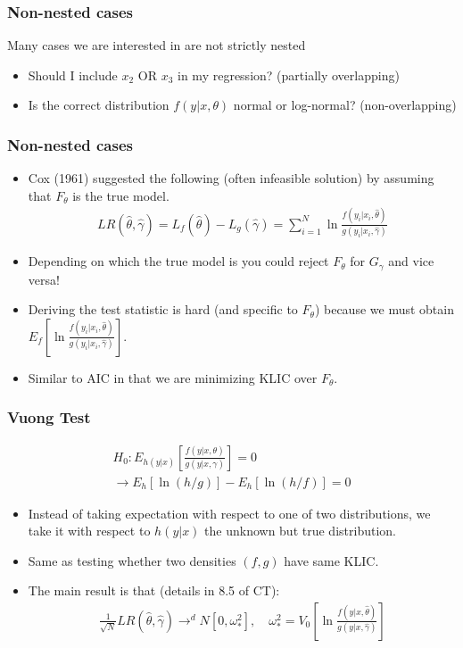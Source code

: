 \documentclass[xcolor=pdftex,dvipsnames,table,mathserif,aspectratio=169]{beamer}
\begin{document}
\begin{frame}
\frametitle{Non-nested cases}
Many cases we are interested in are \alert{not strictly nested}
\begin{itemize}
\item Should I include $x_2$ OR $x_3$ in my regression? (partially overlapping)
\item Is the correct distribution $f(y | x, \theta)$ normal or log-normal? (non-overlapping)
\end{itemize}
\end{frame}

\begin{frame}
\frametitle{Non-nested cases}
\begin{itemize}
\item Cox (1961) suggested the following (often infeasible solution) by assuming that $F_{\theta}$ is the true model.
\begin{eqnarray*}
LR(\hat{\theta},\hat{\gamma}) = L_f(\hat{\theta}) - L_g (\hat{\gamma}) = \sum_{i=1}^N \ln \frac{f(y_i | x_i, \hat{\theta})}{g(y_i | x_i, \hat{\gamma})}
\end{eqnarray*}
\item Depending on which the true model is you could reject $F_{\theta}$ for $G_{\gamma}$ and vice versa!
\item Deriving the test statistic is hard (and specific to $F_{\theta}$) because we must obtain $E_f [\ln \frac{f(y_i | x_i, \hat{\theta})}{g(y_i | x_i, \hat{\gamma})}]$.
\item Similar to AIC in that we are minimizing KLIC over $F_{\theta}$.
\end{itemize}
\end{frame}

\begin{frame}
\frametitle{Vuong Test}
\small
\begin{eqnarray*}
H_0: E_{h(y|x)} \left[ \frac{ f(y | x,\theta) }{g(y | x, \gamma)} \right] = 0  \\
\rightarrow E_h[\ln(h/g)] - E_h[\ln (h/f)] = 0
\end{eqnarray*}
\begin{itemize}
\item Instead of taking expectation with respect to one of two distributions, we take it with respect to $h(y |x)$ the unknown but \alert{true distribution}.
\item Same as testing whether two densities $(f,g)$ have same KLIC.
\item The main result is that (details in 8.5 of CT):
\begin{eqnarray*}
\frac{1}{\sqrt{N}} LR(\hat{\theta},\hat{\gamma}) \rightarrow^d N [0,\omega_{*}^2],\quad \omega_{*}^2 =  V_0 \left[ \ln \frac{f(y| x, \hat{\theta})}{g(y| x, \hat{\gamma})}  \right]
\end{eqnarray*}
\end{itemize}
\end{frame}
\end{document}
